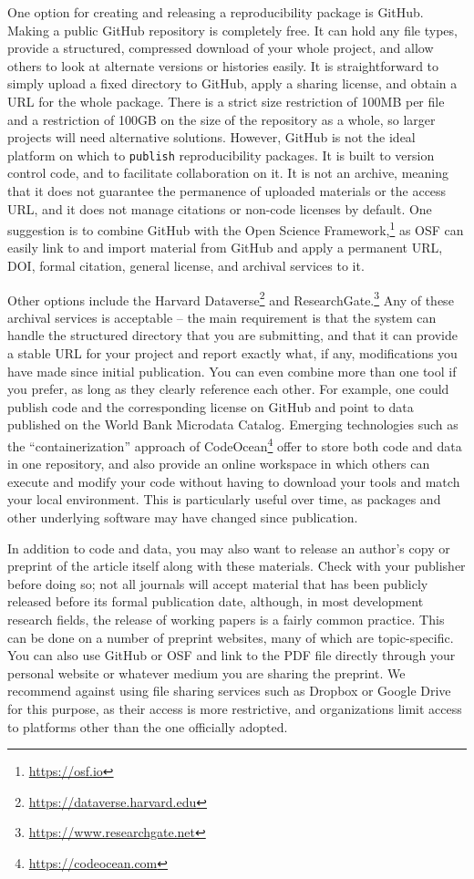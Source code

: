\documentclass[
]{book}
\begin{document}
One option for creating and releasing a reproducibility package is GitHub.
Making a public GitHub repository is completely free.
It can hold any file types,
provide a structured, compressed download of your whole project,
and allow others to look at alternate versions or histories easily.
It is straightforward to simply upload a fixed directory to GitHub,
apply a sharing license, and obtain a URL for the whole package.
There is a strict size restriction of 100MB per file and
a restriction of 100GB on the size of the repository as a whole,
so larger projects will need alternative solutions.
However, GitHub is not the ideal platform
on which to \texttt{publish} reproducibility packages.
It is built to version control code, and to facilitate collaboration on it.
It is not an archive, meaning that it does not guarantee the permanence
of uploaded materials or the access URL,
and it does not manage citations or non-code licenses by default.
One suggestion is to combine GitHub with the Open Science Framework,\footnote{\url{https://osf.io}}
as OSF can easily link to and import material from GitHub and
apply a permanent URL, DOI, formal citation, general license, and archival services to it.

Other options include the Harvard Dataverse\footnote{\url{https://dataverse.harvard.edu}}
and ResearchGate.\footnote{\url{https://www.researchgate.net}}
Any of these archival services is acceptable --
the main requirement is that the system can handle
the structured directory that you are submitting,
and that it can provide a stable URL for your project
and report exactly what, if any,
modifications you have made since initial publication.
You can even combine more than one tool if you prefer,
as long as they clearly reference each other.
For example, one could publish code and the corresponding license on GitHub
and point to data published on the World Bank Microdata Catalog.
Emerging technologies such as the ``containerization'' approach of CodeOcean\footnote{\url{https://codeocean.com}}
offer to store both code and data in one repository,
and also provide an online workspace in which others can execute and modify your code
without having to download your tools and match your local environment.
This is particularly useful over time, as packages and other underlying software may have changed since publication.

In addition to code and data,
you may also want to release an author's copy or preprint
of the article itself along with these materials.
Check with your publisher before doing so;
not all journals will accept material that has been publicly released
before its formal publication date, although,
in most development research fields,
the release of working papers is a fairly common practice.
This can be done on a number of preprint websites,
many of which are topic-specific.
You can also use GitHub or OSF and link to the PDF file directly
through your personal website or whatever medium you are sharing the preprint.
We recommend against using file sharing services such as
Dropbox or Google Drive for this purpose,
as their access is more restrictive,
and organizations limit access to platforms other than the one officially adopted.
\end{document}
